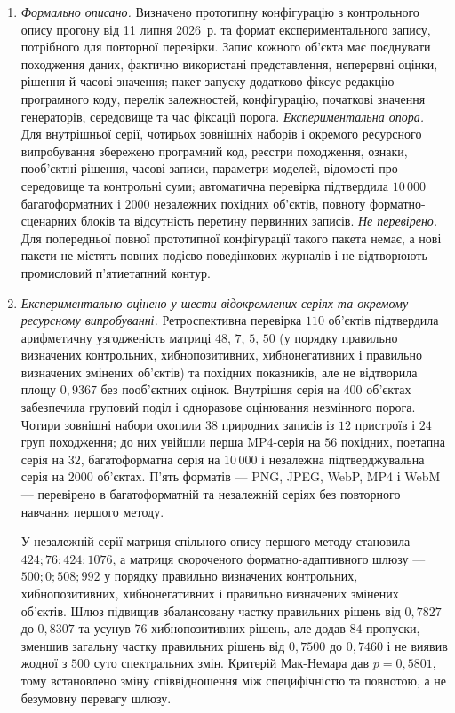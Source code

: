 \begin{enumerate}[label=\arabic*.]
\item \textit{Формально описано.} Визначено прототипну конфігурацію з контрольного опису прогону від 11 липня 2026~р. та формат експериментального запису, потрібного для повторної перевірки. Запис кожного об’єкта має поєднувати походження даних, фактично використані представлення, неперервні оцінки, рішення й часові значення; пакет запуску додатково фіксує редакцію програмного коду, перелік залежностей, конфігурацію, початкові значення генераторів, середовище та час фіксації порога. \textit{Експериментальна опора.} Для внутрішньої серії, чотирьох зовнішніх наборів і окремого ресурсного випробування збережено програмний код, реєстри походження, ознаки, пооб’єктні рішення, часові записи, параметри моделей, відомості про середовище та контрольні суми; автоматична перевірка підтвердила $10\,000$ багатоформатних і $2000$ незалежних похідних об’єктів, повноту форматно-сценарних блоків та відсутність перетину первинних записів. \textit{Не перевірено.} Для попередньої повної прототипної конфігурації такого пакета немає, а нові пакети не містять повних подієво-поведінкових журналів і не відтворюють промисловий п’ятиетапний контур.

\item \textit{Експериментально оцінено у шести відокремлених серіях та окремому ресурсному випробуванні.} Ретроспективна перевірка $110$ об’єктів підтвердила арифметичну узгодженість матриці $48$, $7$, $5$, $50$ (у порядку правильно визначених контрольних, хибнопозитивних, хибнонегативних і правильно визначених змінених об’єктів) та похідних показників, але не відтворила площу $0{,}9367$ без пооб’єктних оцінок. Внутрішня серія на $400$ об’єктах забезпечила груповий поділ і одноразове оцінювання незмінного порога. Чотири зовнішні набори охопили $38$ природних записів із $12$ пристроїв і $24$ груп походження; до них увійшли перша MP4-серія на $56$ похідних, поетапна серія на $32$, багатоформатна серія на $10\,000$ і незалежна підтверджувальна серія на $2000$ об’єктах. П’ять форматів --- PNG, JPEG, WebP, MP4 і WebM --- перевірено в багатоформатній та незалежній серіях без повторного навчання першого методу.

У незалежній серії матриця спільного опису першого методу становила $424;76;424;1076$, а матриця скороченого форматно-адаптивного шлюзу --- $500;0;508;992$ у порядку правильно визначених контрольних, хибнопозитивних, хибнонегативних і правильно визначених змінених об’єктів. Шлюз підвищив збалансовану частку правильних рішень від $0{,}7827$ до $0{,}8307$ та усунув $76$ хибнопозитивних рішень, але додав $84$ пропуски, зменшив загальну частку правильних рішень від $0{,}7500$ до $0{,}7460$ і не виявив жодної з $500$ суто спектральних змін. Критерій Мак-Немара дав $p=0{,}5801$, тому встановлено зміну співвідношення між специфічністю та повнотою, а не безумовну перевагу шлюзу.


\end{enumerate}
